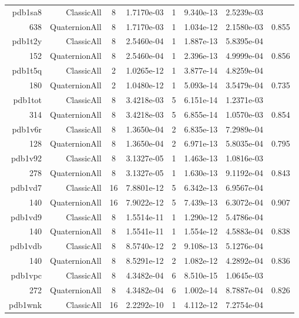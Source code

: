 \begin{xltabular}{\textwidth}{r|rcS[table-format=1.4e+2]cS[table-format=1.3e+2]S[table-format=1.4e+2]S[table-format=-1.3]}
pdb1sa8 & ClassicAll & 8 & 1.7170e-03 & 1 & 9.340e-13 & 2.5239e-03 & \\
638 & QuaternionAll & 8 & 1.7170e-03 & 1 & 1.034e-12 & 2.1580e-03 & 0.855\\  \addlinespace
pdb1t2y & ClassicAll & 8 & 2.5460e-04 & 1 & 1.887e-13 & 5.8395e-04 & \\
152 & QuaternionAll & 8 & 2.5460e-04 & 1 & 2.396e-13 & 4.9999e-04 & 0.856\\  \addlinespace
pdb1t5q & ClassicAll & 2 & 1.0265e-12 & 1 & 3.877e-14 & 4.8259e-04 & \\
180 & QuaternionAll & 2 & 1.0480e-12 & 1 & 5.093e-14 & 3.5479e-04 & 0.735\\  \addlinespace
pdb1tot & ClassicAll & 8 & 3.4218e-03 & 5 & 6.151e-14 & 1.2371e-03 & \\
314 & QuaternionAll & 8 & 3.4218e-03 & 5 & 6.855e-14 & 1.0570e-03 & 0.854\\  \addlinespace
pdb1v6r & ClassicAll & 8 & 1.3650e-04 & 2 & 6.835e-13 & 7.2989e-04 & \\
128 & QuaternionAll & 8 & 1.3650e-04 & 2 & 6.971e-13 & 5.8035e-04 & 0.795\\  \addlinespace
pdb1v92 & ClassicAll & 8 & 3.1327e-05 & 1 & 1.463e-13 & 1.0816e-03 & \\
278 & QuaternionAll & 8 & 3.1327e-05 & 1 & 1.630e-13 & 9.1192e-04 & 0.843\\  \addlinespace
pdb1vd7 & ClassicAll & 16 & 7.8801e-12 & 5 & 6.342e-13 & 6.9567e-04 & \\
140 & QuaternionAll & 16 & 7.9022e-12 & 5 & 7.439e-13 & 6.3072e-04 & 0.907\\  \addlinespace
pdb1vd9 & ClassicAll & 8 & 1.5514e-11 & 1 & 1.290e-12 & 5.4786e-04 & \\
140 & QuaternionAll & 8 & 1.5541e-11 & 1 & 1.554e-12 & 4.5883e-04 & 0.838\\  \addlinespace
pdb1vdb & ClassicAll & 8 & 8.5740e-12 & 2 & 9.108e-13 & 5.1276e-04 & \\
140 & QuaternionAll & 8 & 8.5291e-12 & 2 & 1.082e-12 & 4.2892e-04 & 0.836\\  \addlinespace
pdb1vpc & ClassicAll & 8 & 4.3482e-04 & 6 & 8.510e-15 & 1.0645e-03 & \\
272 & QuaternionAll & 8 & 4.3482e-04 & 6 & 1.002e-14 & 8.7887e-04 & 0.826\\  \addlinespace
pdb1wnk & ClassicAll & 16 & 2.2292e-10 & 1 & 4.112e-12 & 7.2754e-04 & \\

\end{xltabular}
